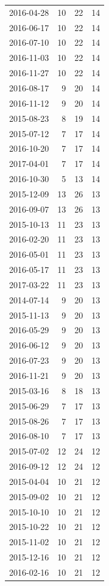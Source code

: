 \begin{tabular}{lrrr}
2016-04-28 & 10 & 22 & 14 \\
2016-06-17 & 10 & 22 & 14 \\
2016-07-10 & 10 & 22 & 14 \\
2016-11-03 & 10 & 22 & 14 \\
2016-11-27 & 10 & 22 & 14 \\
2016-08-17 & 9 & 20 & 14 \\
2016-11-12 & 9 & 20 & 14 \\
2015-08-23 & 8 & 19 & 14 \\
2015-07-12 & 7 & 17 & 14 \\
2016-10-20 & 7 & 17 & 14 \\
2017-04-01 & 7 & 17 & 14 \\
2016-10-30 & 5 & 13 & 14 \\
2015-12-09 & 13 & 26 & 13 \\
2016-09-07 & 13 & 26 & 13 \\
2015-10-13 & 11 & 23 & 13 \\
2016-02-20 & 11 & 23 & 13 \\
2016-05-01 & 11 & 23 & 13 \\
2016-05-17 & 11 & 23 & 13 \\
2017-03-22 & 11 & 23 & 13 \\
2014-07-14 & 9 & 20 & 13 \\
2015-11-13 & 9 & 20 & 13 \\
2016-05-29 & 9 & 20 & 13 \\
2016-06-12 & 9 & 20 & 13 \\
2016-07-23 & 9 & 20 & 13 \\
2016-11-21 & 9 & 20 & 13 \\
2015-03-16 & 8 & 18 & 13 \\
2015-06-29 & 7 & 17 & 13 \\
2015-08-26 & 7 & 17 & 13 \\
2016-08-10 & 7 & 17 & 13 \\
2015-07-02 & 12 & 24 & 12 \\
2016-09-12 & 12 & 24 & 12 \\
2015-04-04 & 10 & 21 & 12 \\
2015-09-02 & 10 & 21 & 12 \\
2015-10-10 & 10 & 21 & 12 \\
2015-10-22 & 10 & 21 & 12 \\
2015-11-02 & 10 & 21 & 12 \\
2015-12-16 & 10 & 21 & 12 \\
2016-02-16 & 10 & 21 & 12 \\

\end{tabular}
